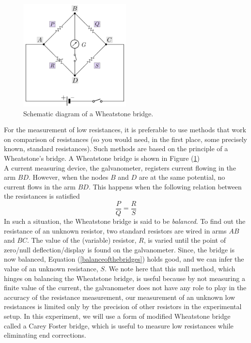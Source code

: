 \begin{figure}[!htb]
    \centering
    \includegraphics[width=0.5\textwidth]{figs/wheatstone.png}
    \caption{Schematic diagram of a Wheatstone bridge.}
    \label{fig:wheatstone}
\end{figure}

For the measurement of low resistances, it is preferable to use methods that work on comparison of resistances (so you would need, in the first place, some precisely known, standard resistances). Such methods are based on the principle of a Wheatstone's bridge. A Wheatstone bridge is shown in Figure (\ref{fig:wheatstone})\\
A current measuring device, the galvanometer, registers current flowing in the arm $BD$. However, when the nodes $B$ and $D$ are at the same potential, no current flows in the arm $BD$. This happens when the following relation between the resistances is satisfied
\begin{equation}
    \frac{P}{Q}  =\frac{R}{S}
    \label{balanceofthebridges}
\end{equation}
In such a situation, the Wheatstone bridge is said to be \textit{balanced}.
To find out the resistance of an unknown resistor, two standard resistors are wired in arms $AB$ and $BC$. The value of the (variable) resistor, $R$, is varied until the point of zero/null deflection/display is found on the galvanometer. Since, the bridge is now balanced, Equation (\ref{balanceofthebridges}) holds good, and we can infer the value of an unknown resistance, $S$. 
We note here that this null method, which hinges on balancing the Wheatstone bridge, is useful because by not measuring a finite value of the current, the galvanometer does not have any role to play in the accuracy of the resistance measurement, our measurement of an unknown low resistances is limited only by the precision of other resistors in the experimental setup.
In this experiment, we will use a form of modified Wheatstone bridge called a Carey Foster bridge, which is useful to measure low resistances while eliminating end corrections.

